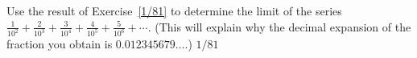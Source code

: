 {Use the result of Exercise~\ref{1/81} to determine the limit of the series $\frac{1}{10^2}+\frac{2}{10^3}+\frac{3}{10^4}+\frac{4}{10^5}+\frac{5}{10^6}+\cdots$.  (This will explain why the decimal expansion of the fraction you obtain is $0.012345679\dots$.)
}
{$1/81$
}